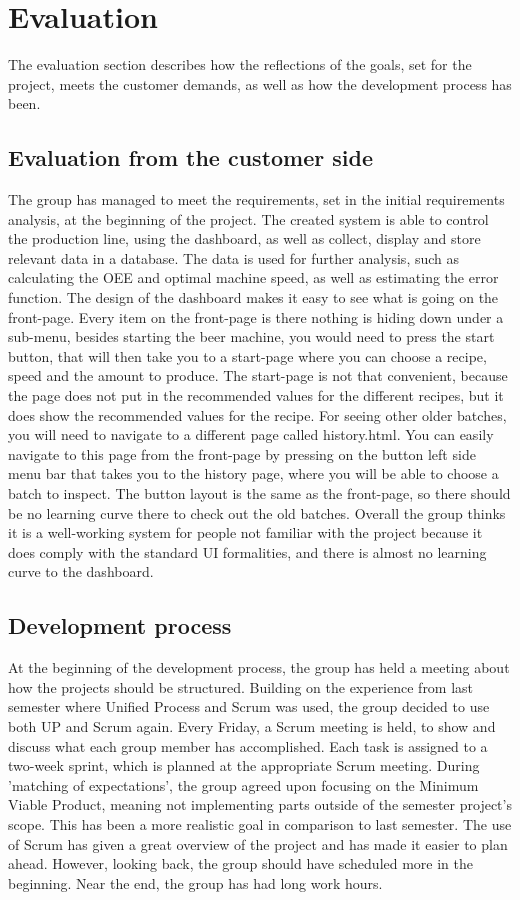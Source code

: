 \section{Evaluation}
The evaluation section describes how the reflections of the goals, set for the
project, meets the customer demands, as well as how the development process has
been.


\subsection{Evaluation from the customer side}
The group has managed to meet the requirements, set in the initial requirements
analysis, at the beginning of the project. The created system is able to control
the production line, using the dashboard, as well as collect, display and
store relevant data in a database. The data is used for further analysis, such
as calculating the OEE and optimal machine speed, as well as estimating the
error function.
The design of the dashboard makes it easy to see what is going on the front-page.
Every item on the front-page is there nothing is hiding down under a sub-menu,
besides starting the beer machine, you would need to press the start button,
that will then take you to a start-page where you can choose a recipe, speed and 
the amount to produce. The start-page is not that convenient, because the page 
does not put in the recommended values for the different recipes, but it does
show the recommended values for the recipe.
For seeing other older batches, you will need to navigate to a different page
called history.html. You can easily navigate to this page from the front-page by
pressing on the button left side menu bar that takes you to the history page,
where you will be able to choose a batch to inspect.
The button layout is the same as the front-page, so there should be no learning
curve there to check out the old batches.
Overall the group thinks it is a well-working system for people not familiar
with the project because it does comply with the standard UI formalities, and
there is almost no learning curve to the dashboard.


\subsection{Development process}
At the beginning of the development process, the group has held a meeting
about how the projects should be structured. Building on the experience from
last semester where Unified Process and Scrum was used, the group
decided to use both UP and Scrum again. Every Friday, a Scrum meeting is held,
to show and discuss what each group member has accomplished. Each task is
assigned to a two-week sprint, which is planned at the appropriate Scrum
meeting.
During 'matching of expectations', the group agreed upon focusing on the Minimum
Viable Product, meaning not implementing parts outside of the semester project's
scope. This has been a more realistic goal in comparison to last semester.
The use of Scrum has given a great overview of the project and has made it 
easier to plan ahead. However, looking back, the group should have scheduled 
more in the beginning. Near the end, the group has had long work hours.

